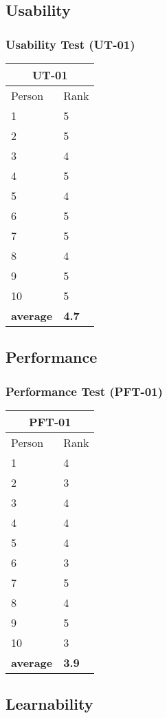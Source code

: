 \documentclass[12pt, titlepage]{article}
\begin{document}
\subsection{Usability}
\subsubsection{Usability Test (UT-01)}
\begin{tabular}{ |p{5cm}|p{5cm}|  }
 \hline
 \multicolumn{2}{|c|}{UT-01} \\
 \hline
Person & Rank\\
 \hline
1 & 5\\
2 & 5\\
3 & 4\\
4 & 5\\
5 & 4\\
6 & 5\\
7 & 5\\
8 & 4\\
9 & 5\\
10 & 5\\
\textbf{average} & \textbf{4.7}\\
 \hline
\end{tabular}
		
\subsection{Performance}
\subsubsection{Performance Test (PFT-01)}
\begin{tabular}{ |p{5cm}|p{5cm}|  }
 \hline
 \multicolumn{2}{|c|}{PFT-01} \\
 \hline
Person & Rank\\
 \hline
1 & 4\\
2 & 3\\
3 & 4\\
4 & 4\\
5 & 4\\
6 & 3\\
7 & 5\\
8 & 4\\
9 & 5\\
10 & 3\\
\textbf{average} & \textbf{3.9}\\
 \hline
\end{tabular}

\subsection{Learnability}
\end{document}
